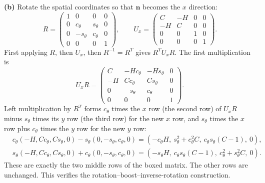 \textbf{(b)} Rotate the spatial coordinates so that $\mathbf n$
becomes the $x$ direction:
\[
R=\begin{pmatrix}
1&0&0&0\\0&c_\theta&s_\theta&0\\
0&-s_\theta&c_\theta&0\\0&0&0&1
\end{pmatrix},\qquad
U_x=\begin{pmatrix}
C&-H&0&0\\-H&C&0&0\\0&0&1&0\\0&0&0&1
\end{pmatrix}.
\]
First applying $R$, then $U_x$, then $R^{-1}=R^T$ gives
$R^TU_xR$. The first multiplication is
\[
U_xR=
\begin{pmatrix}
C&-Hc_\theta&-Hs_\theta&0\\
-H&Cc_\theta&Cs_\theta&0\\
0&-s_\theta&c_\theta&0\\0&0&0&1
\end{pmatrix}.
\]
Left multiplication by $R^T$ forms
$c_\theta$ times the $x$ row (the second row) of $U_xR$ minus
$s_\theta$ times its $y$ row (the third row) for the new $x$ row,
and $s_\theta$ times the $x$ row plus $c_\theta$ times the $y$ row
for the new $y$ row:
\[
\begin{aligned}
&c_\theta(-H,Cc_\theta,Cs_\theta,0)-s_\theta(0,-s_\theta,c_\theta,0)
=(-c_\theta H,\ s_\theta^2+c_\theta^2C,\ c_\theta s_\theta(C-1),\ 0),\\
&s_\theta(-H,Cc_\theta,Cs_\theta,0)+c_\theta(0,-s_\theta,c_\theta,0)
=(-s_\theta H,\ c_\theta s_\theta(C-1),\ c_\theta^2+s_\theta^2C,\ 0).
\end{aligned}
\]
These are exactly the
two middle rows of the boxed matrix. The other rows are unchanged.
This verifies the rotation--boost--inverse-rotation construction.

